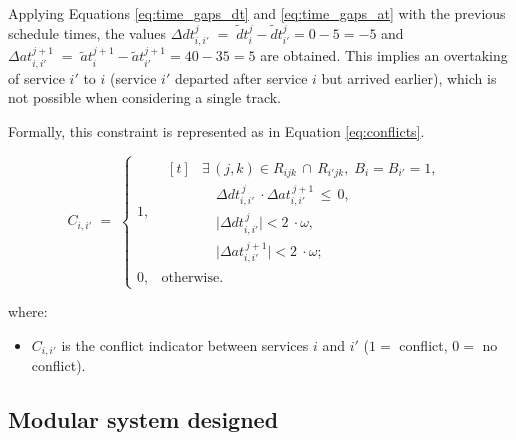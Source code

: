 \documentclass[Afour,sagev,times]{sagej}
\begin{document}
Applying Equations  \ref{eq:time_gaps_dt} and \ref{eq:time_gaps_at} with the previous schedule times, the values $ \Delta dt_{i,i'}^{j} \;=\; \tilde dt_{i}^{j} - \tilde dt_{i'}^{j} = 0 - 5 = - 5 $ and $ \Delta at_{i,i'}^{j+1} \;=\; \tilde at_{i}^{j+1} - \tilde at_{i'}^{j+1} = 40 - 35 = 5 $ are obtained. This implies an overtaking of service  $ i' $ to $ i $ (service $ i' $ departed after service $ i $ but arrived earlier), which is not possible when considering a single track.

Formally, this constraint is represented as in Equation \ref{eq:conflicts}.


\begin{equation}
C_{i,i'} \;=\;
\begin{cases}
1, & 
\begin{aligned}[t]
&\exists\,(j,k)\in R_{ijk}\,\cap\,R_{i'jk},\;B_{i}=B_{i'}=1,\; \\
&\quad \Delta dt_{i,i'}^{\,j}\ \cdot \Delta at_{i,i'}^{\,j+1} \,\le\,0,\\
&\quad \bigl|\Delta dt_{i,i'}^{\,j}\bigr| < 2\ \cdot \omega,\\
&\quad \bigl|\Delta at_{i,i'}^{\,j+1}\bigr| < 2\ \cdot \omega;
\end{aligned}
\\[2ex]
0, & \text{otherwise.}
\end{cases}
\label{eq:conflicts}
\end{equation}


where:
\begin{itemize}
  \item $C_{i,i'}$ is the conflict indicator between services $i$ and $i'$ ($1=$ conflict, $0=$ no conflict).
\end{itemize}

\subsection{Modular system designed}
\label{sec:modular_system_designed}
\end{document}
